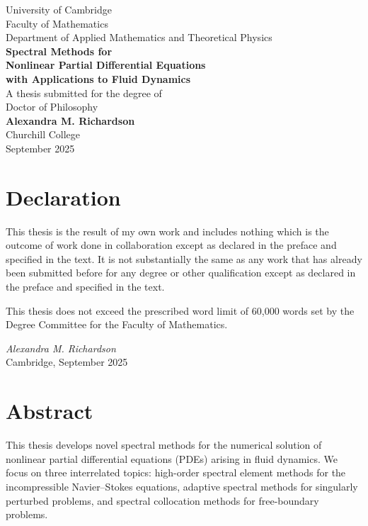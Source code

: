 \documentclass[12pt,a4paper,oneside]{report}
\begin{document}
\begin{titlepage}
\centering
\vspace*{1.5cm}
{\Large University of Cambridge\\[0.3cm]}
{\large Faculty of Mathematics\\Department of Applied Mathematics and Theoretical Physics\\[2cm]}
{\Huge\bfseries Spectral Methods for\\Nonlinear Partial Differential Equations\\with Applications to Fluid Dynamics\\[1.5cm]}
{\Large A thesis submitted for the degree of\\Doctor of Philosophy\\[2cm]}
{\Large\textbf{Alexandra M. Richardson}\\[0.5cm]}
{\large Churchill College\\[1cm]}
{\large September 2025}
\vfill
\end{titlepage}

\chapter*{Declaration}

This thesis is the result of my own work and includes nothing which is the outcome of work done in collaboration except as declared in the preface and specified in the text. It is not substantially the same as any work that has already been submitted before for any degree or other qualification except as declared in the preface and specified in the text.

This thesis does not exceed the prescribed word limit of 60,000 words set by the Degree Committee for the Faculty of Mathematics.

\vspace{2cm}
\noindent\textit{Alexandra M. Richardson}\\
Cambridge, September 2025

\chapter*{Abstract}

This thesis develops novel spectral methods for the numerical solution of nonlinear partial differential equations (PDEs) arising in fluid dynamics. We focus on three interrelated topics: high-order spectral element methods for the incompressible Navier--Stokes equations, adaptive spectral methods for singularly perturbed problems, and spectral collocation methods for free-boundary problems.
\end{document}
